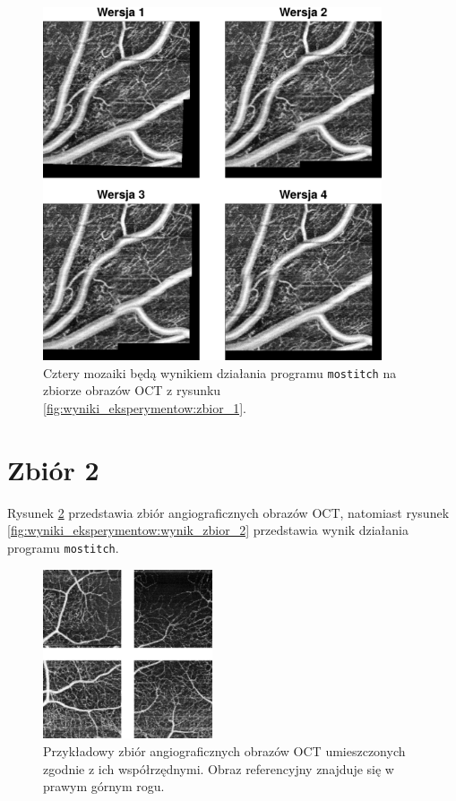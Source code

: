\begin{figure}[htb]
  \centering
  \includegraphics[width=10cm]{gfx/wynik_zbior_1}
  \caption{Cztery mozaiki będą wynikiem działania programu \texttt{mostitch} na zbiorze obrazów OCT z rysunku \ref{fig:wyniki_eksperymentow:zbior_1}.}
  \label{fig:wyniki_eksperymentow:wynik_zbior_1}
\end{figure}

\section{Zbiór 2}
\label{sec:zbior_2}

Rysunek \ref{fig:wyniki_eksperymentow:zbior_2} przedstawia zbiór angiograficznych obrazów OCT, natomiast rysunek \ref{fig:wyniki_eksperymentow:wynik_zbior_2} przedstawia wynik działania programu \texttt{mostitch}.

\begin{figure}[H]
  \centering
  \includegraphics[width=5cm]{gfx/zbior_2}
  \caption{Przykładowy zbiór angiograficznych obrazów OCT umieszczonych zgodnie z ich współrzędnymi. Obraz referencyjny znajduje się w prawym górnym rogu.}
  \label{fig:wyniki_eksperymentow:zbior_2}
\end{figure}

